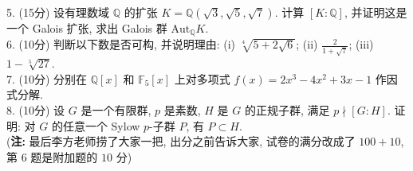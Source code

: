 \documentclass[UTF8]{ctexart}
\begin{document}
5. (15分) 设有理数域 $\mathbb{Q}$ 的扩张 $K=\mathbb{Q}(\sqrt{3},\sqrt{5},\sqrt{7})$. 计算 $[K:\mathbb{Q}]$, 并证明这是一个 Galois 扩张, 求出 Galois 群 $\text{Aut}_{\mathbb{Q}}K$.
\\

6. (10分) 判断以下数是否可构, 并说明理由: (i) $\sqrt[4]{5+2\sqrt{6}}$; (ii) $\displaystyle\frac{2}{1+\sqrt{7}}$; (iii) $1-\sqrt[5]{27}$.
\\

7. (10分) 分别在 $\mathbb{Q}[x]$ 和 $\mathbb{F}_5[x]$ 上对多项式 $f(x)=2x^3-4x^2+3x-1$ 作因式分解.
\\

8. (10分) 设 $G$ 是一个有限群, $p$ 是素数, $H$ 是 $G$ 的正规子群, 满足 $p\nmid[G:H]$. 证明: 对 $G$ 的任意一个 Sylow $p$-子群 $P$, 有 $P\subset H$.
\\

(\textbf{注:} 最后李方老师捞了大家一把, 出分之前告诉大家, 试卷的满分改成了 $100+10$, 第 $6$ 题是附加题的 $10$ 分)
\end{document}
